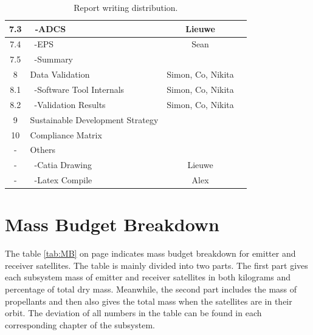 \begin{table}[ht!]
{\begin{tabular}{|c|l|c|c|}
 7.3     & \ -ADCS                              & Lieuwe &\\\hline
 7.4     & \ -EPS                               & Sean &\\\hline
 7.5     & \ -Summary                           &\\\hline\hline
 8       & Data Validation                      & Simon, Co, Nikita &\\\hline
 8.1     & \ -Software Tool Internals           & Simon, Co, Nikita &\\\hline
 8.2     & \ -Validation Results                & Simon, Co, Nikita &\\\hline
 9       & Sustainable Development Strategy     &\\\hline
 10      & Compliance Matrix                    &\\\hline\hline
 -       & Others                               &\\\hline
 -       & \ -Catia Drawing                     & Lieuwe &\\\hline
 -       & \ -Latex Compile                     & Alex &\\\hline

\end{tabular}
}
\caption{Report writing distribution.}
\label{tab:RWD}
\end{table}

\section{Mass Budget Breakdown}
\label{DDMBB}
The table \ref{tab:MB} on page \pageref{tab:MB} indicates mass budget breakdown for emitter and receiver satellites. The table is mainly divided into two parts. The first part gives each subsystem mass of emitter and receiver satellites in both kilograms and percentage of total dry mass. Meanwhile, the second part includes the mass of propellants and then also gives the total mass when the satellites are in their orbit. The deviation of all numbers in the table can be found in each corresponding chapter of the subsystem.

